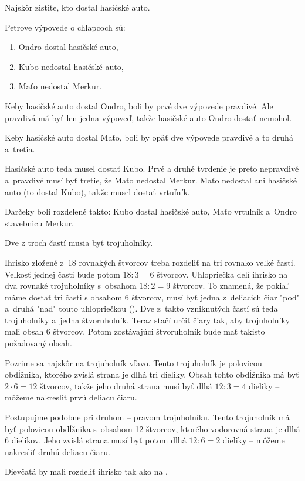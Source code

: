 {%
\napad
Najskôr zistite, kto dostal hasičské auto.

\riesenie
Petrove výpovede o chlapcoch sú:
\begin{enumerate}
  \item  Ondro dostal hasičské auto,
  \item  Kubo nedostal hasičské auto,
  \item  Maťo nedostal Merkur.
\end{enumerate}
Keby hasičské auto dostal Ondro, boli by prvé dve výpovede pravdivé.
Ale pravdivá má byť len jedna výpoveď, takže hasičské auto Ondro dostať
nemohol.

Keby hasičské auto dostal Maťo, boli by opäť dve výpovede pravdivé a to druhá a~tretia.

Hasičské auto teda musel dostať Kubo.
Prvé a druhé tvrdenie je preto nepravdivé a~pravdivé musí byť tretie, že Maťo
nedostal Merkur.
Maťo nedostal ani hasičské auto (to dostal Kubo), takže musel dostať
vrtuľník.

Darčeky boli rozdelené takto:
Kubo dostal hasičské auto, Maťo vrtuľník a~Ondro stavebnicu Merkur.
}

{%
\napad
Dve z troch častí musia byť trojuholníky.

\riesenie
Ihrisko zložené z~18 rovnakých štvorcov treba rozdeliť na tri rovnako veľké časti.
Veľkosť jednej časti bude potom $18:3=6$ štvorcov.
Uhlopriečka delí ihrisko na dva rovnaké trojuholníky s~obsahom $18:2=9$
štvorcov.
To znamená, že pokiaľ máme dostať tri časti s obsahom 6 štvorcov, musí byť
jedna z~deliacich čiar "pod" a~druhá "nad" touto uhlopriečkou (\obr).
Dve z~takto vzniknutých častí sú teda trojuholníky a~jedna štvoruholník.
Teraz stačí určiť čiary tak, aby trojuholníky mali obsah 6 štvorcov. Potom zostávajúci štvoruholník bude mať takisto požadovaný obsah.
%

Pozrime sa najskôr na trojuholník vľavo.
Tento trojuholník je polovicou obdĺžnika, ktorého zvislá strana je dlhá tri dieliky. Obsah tohto obdĺžnika má byť $2\cdot 6=12$ štvorcov, takže jeho druhá strana
musí byť dlhá $12:3=4$ dieliky -- môžeme nakresliť prvú deliacu čiaru.

Postupujme podobne pri druhom -- pravom trojuholníku.
Tento trojuholník má byť polovicou obdĺžnika s~obsahom 12 štvorcov,
ktorého vodorovná strana je dlhá 6 dielikov.
Jeho zvislá strana musí byť potom dlhá $12:6=2$ dieliky
-- môžeme nakresliť druhú deliacu čiaru.

Dievčatá by mali rozdeliť ihrisko tak ako na \obr.
%
}

